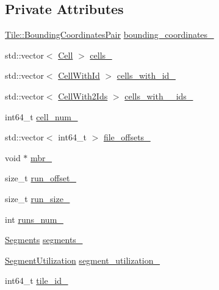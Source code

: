 \subsection*{Private Attributes}
\begin{DoxyCompactItemize}
\item 
\hyperlink{classTile_a7103069b7ba05d1032733e3a026b8632}{Tile\+::\+Bounding\+Coordinates\+Pair} \hyperlink{structWriteState_a50b41a53268ae74bec6e24695624f9d0}{bounding\+\_\+coordinates\+\_\+}
\item 
std\+::vector$<$ \hyperlink{structWriteState_1_1Cell}{Cell} $>$ \hyperlink{structWriteState_a90d90b4abfd9e35f1726842617122558}{cells\+\_\+}
\item 
std\+::vector$<$ \hyperlink{structWriteState_1_1CellWithId}{Cell\+With\+Id} $>$ \hyperlink{structWriteState_a296e22c27c0c1965771670d3bdd2dfd5}{cells\+\_\+with\+\_\+id\+\_\+}
\item 
std\+::vector$<$ \hyperlink{structWriteState_1_1CellWith2Ids}{Cell\+With2\+Ids} $>$ \hyperlink{structWriteState_a1b14e06c30ce9617b2f1a16263b1a134}{cells\+\_\+with\+\_\+\_\+ids\+\_\+}
\item 
int64\+\_\+t \hyperlink{structWriteState_a059d757cb8fbc5bb7bfff6e1f5ea7f79}{cell\+\_\+num\+\_\+}
\item 
std\+::vector$<$ int64\+\_\+t $>$ \hyperlink{structWriteState_a94e403575a527bf5b592cd56b37312a9}{file\+\_\+offsets\+\_\+}
\item 
void $\ast$ \hyperlink{structWriteState_a263affe5c47bb910058cda181facd393}{mbr\+\_\+}
\item 
size\+\_\+t \hyperlink{structWriteState_aa81ec074dba266202c72f1dc5b34d28a}{run\+\_\+offset\+\_\+}
\item 
size\+\_\+t \hyperlink{structWriteState_a77bff60be493ad28638135d43f4929c5}{run\+\_\+size\+\_\+}
\item 
int \hyperlink{structWriteState_a6c1e55b3b77f064ada008f83f61ceb51}{runs\+\_\+num\+\_\+}
\item 
\hyperlink{structWriteState_aad30b2ca76d7c514032911e74076cfc5}{Segments} \hyperlink{structWriteState_a4261c22f11c9f6bd4e5ef0ad91e13c90}{segments\+\_\+}
\item 
\hyperlink{structWriteState_ae2a9d7195188e68b68d0c33725cbf460}{Segment\+Utilization} \hyperlink{structWriteState_a45a9a04b9520ed82c87322acfa94a72c}{segment\+\_\+utilization\+\_\+}
\item 
int64\+\_\+t \hyperlink{structWriteState_a6f1997f7702ccd133959484348faf49d}{tile\+\_\+id\+\_\+}
\end{DoxyCompactItemize}
